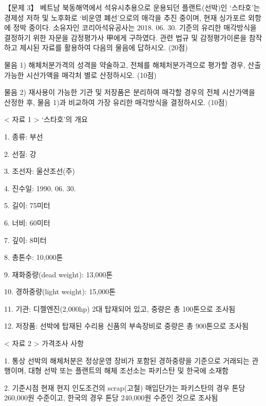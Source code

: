 \begin{longquestion}{【문제 3】}
베트남 북동해역에서 석유시추용으로 운용되던 플랜트(선박)인 ‘스타호’는 경제성 저하 및 노후화로 ‘비운영 폐선’으로의 매각을 추진 중이며, 현재 싱가포르 외항에 정박 중이다. 소유자인 코리아석유공사는 2018. 06. 30. 기준의 유리한 매각방식을 결정하기 위한 자문을 감정평가사 甲에게 구하였다. 관련 법규 및 감정평가이론을 참작하고 제시된 자료를 활용하여 다음의 물음에 답하시오. (20점) \par
\medskip\noindent 물음 1) 해체처분가격의 성격을 약술하고, 전체를 해체처분가격으로 평가할 경우, 산출 가능한 시산가액을 매각처 별로 산정하시오. (10점) \par
\medskip\noindent 물음 2) 재사용이 가능한 기관 및 저장품은 분리하여 매각할 경우의 전체 시산가액을 산정한 후, 물음 1)과 비교하여 가장 유리한 매각방식을 결정하시오. (10점) \par
< 자료 1 > ‘스타호’의 개요 \par
1. 종류: 부선 \par
2. 선질: 강 \par
3. 조선자: 울산조선(주) \par
4. 진수일: 1990. 06. 30. \par
5. 길이: 75미터 \par
6. 너비: 60미터 \par
7. 깊이: 8미터 \par
8. 총톤수: 10,000톤 \par
9. 재화중량(dead weight): 13,000톤 \par
10. 경하중량(light weight): 15,000톤 \par
11. 기관: 디젤엔진(2,000hp) 2대 탑재되어 있고, 중량은 총 100톤으로 조사됨 \par
12. 저장품: 선박에 탑재된 수리용 신품의 부속장비로 중량은 총 900톤으로 조사됨 \par
< 자료 2 > 가격조사 사항 \par
1. 통상 선박의 해체처분은 정상운영 장비가 포함된 경하중량을 기준으로 거래되는 관행이며, 대형 선박 또는 플랜트의 해체 조선소는 파키스탄 및 한국에 소재함 \par
2. 기준시점 현재 현지 인도조건의 scrap(고철) 매입단가는 파키스탄의 경우 톤당 260,000원 수준이고, 한국의 경우 톤당 240,000원 수준인 것으로 조사됨 \par

\end{longquestion}
